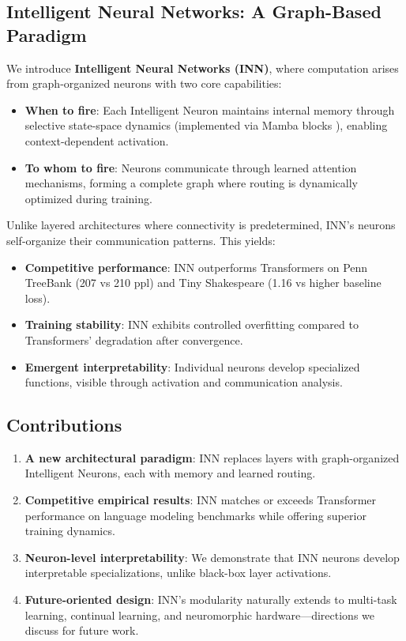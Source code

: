 \documentclass{article}
\begin{document}
\subsection{Intelligent Neural Networks: A Graph-Based Paradigm}

We introduce \textbf{Intelligent Neural Networks (INN)}, where computation arises from graph-organized neurons with two core capabilities:

\begin{itemize}
    \item \textbf{When to fire}: Each Intelligent Neuron maintains internal memory through selective state-space dynamics (implemented via Mamba blocks \cite{gu2023mamba}), enabling context-dependent activation.
    \item \textbf{To whom to fire}: Neurons communicate through learned attention mechanisms, forming a complete graph where routing is dynamically optimized during training.
\end{itemize}

Unlike layered architectures where connectivity is predetermined, INN's neurons self-organize their communication patterns. This yields:
\begin{itemize}
    \item \textbf{Competitive performance}: INN outperforms Transformers on Penn TreeBank (207 vs 210 ppl) and Tiny Shakespeare (1.16 vs higher baseline loss).
    \item \textbf{Training stability}: INN exhibits controlled overfitting compared to Transformers' degradation after convergence.
    \item \textbf{Emergent interpretability}: Individual neurons develop specialized functions, visible through activation and communication analysis.
\end{itemize}

\subsection{Contributions}

\begin{enumerate}
    \item \textbf{A new architectural paradigm}: INN replaces layers with graph-organized Intelligent Neurons, each with memory and learned routing.
    \item \textbf{Competitive empirical results}: INN matches or exceeds Transformer performance on language modeling benchmarks while offering superior training dynamics.
    \item \textbf{Neuron-level interpretability}: We demonstrate that INN neurons develop interpretable specializations, unlike black-box layer activations.
    \item \textbf{Future-oriented design}: INN's modularity naturally extends to multi-task learning, continual learning, and neuromorphic hardware—directions we discuss for future work.
\end{enumerate}
\end{document}
